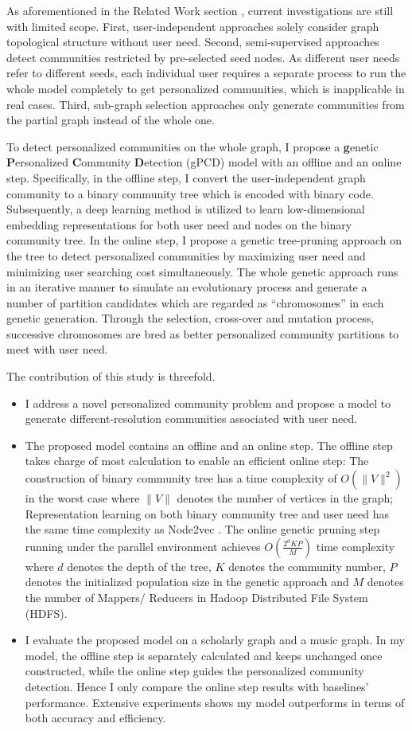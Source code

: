 As aforementioned in the Related Work section , current investigations are still with limited scope. First, user-independent approaches solely consider graph topological structure without user need. Second, semi-supervised approaches detect communities restricted by pre-selected seed nodes. As different user needs refer to different seeds, each individual user requires a separate process to run the whole model completely to get personalized communities, which is inapplicable in real cases. Third, sub-graph selection approaches only generate communities from the partial graph instead of the whole one.  

To detect personalized communities on the whole graph, I propose a \textbf{g}enetic \textbf{P}ersonalized \textbf{C}ommunity \textbf{D}etection (gPCD) model with an offline and an online step. Specifically, in the offline step, I convert the user-independent graph community to a binary community tree which is encoded with binary code. Subsequently, a deep learning method is utilized to learn low-dimensional embedding representations for both user need and nodes on the binary community tree. In the online step, I propose a genetic tree-pruning approach on the tree to detect personalized communities by maximizing user need and minimizing user searching cost simultaneously. The whole genetic approach runs in an iterative manner to simulate an evolutionary process and generate a number of partition candidates which are regarded as ``chromosomes'' in each genetic generation. Through the selection, cross-over and mutation process, successive chromosomes are bred as better personalized community partitions to meet with user need.

The contribution of this study is threefold. 
\begin{itemize}
	\item I address a novel personalized community problem and propose a model to generate different-resolution communities associated with user need.   
	\item The proposed model contains an offline and an online step. The offline step takes charge of most calculation to enable an efficient online step: The construction of binary community tree has a time complexity of $O(\rVert V\lVert^{2})$ in the worst case where $\rVert V\lVert$ denotes the number of vertices in the graph; Representation learning on both binary community tree and user need has the same time complexity as Node2vec \cite{grover2016node2vec}. The online genetic pruning step running under the parallel environment achieves $O(\frac{2^dKP}{M})$ time complexity where $d$ denotes the depth of the tree, $K$ denotes the community number, $P$ denotes the initialized population size in the genetic approach and $M$ denotes the number of Mappers/ Reducers in Hadoop Distributed File System (HDFS). 
	\item I evaluate the proposed model on a scholarly graph and a music graph. In my model, the offline step is separately calculated and keeps unchanged once constructed, while the online step guides the personalized community detection. Hence I only compare the online step results with baselines' performance. Extensive experiments shows my model outperforms in terms of both accuracy and efficiency.
\end{itemize}